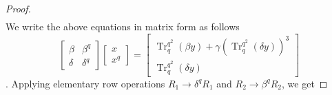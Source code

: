 \documentclass{birkjour}
\theoremstyle{definition}
\theoremstyle{remark}
\numberwithin{equation}{section}
\begin{document}
\begin{proof}
\begin{align}
	\end{align}
	We write the above equations in matrix form as follows\\
	$$\begin{bmatrix}
		\beta&\beta^{q}\\
		\delta&\delta^{q}
	\end{bmatrix}
	\begin{bmatrix}
		x\\x^{q}
	\end{bmatrix}=
	\begin{bmatrix}
		\operatorname{Tr}_{q}^{q^2}(\beta y)+\gamma(\operatorname{Tr}_{q}^{q^2}(\delta y))^3\\
		\operatorname{Tr}_{q}^{q^2}(\delta y)
	\end{bmatrix}$$.
	Applying elementary row operations $R_1\rightarrow\delta^{q}R_1$ and $R_2\rightarrow\beta^{q}R_2$, we get
	

\end{proof}
\end{document}
